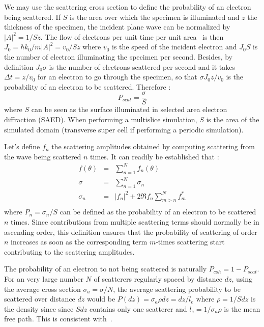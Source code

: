We may use the scattering cross section to define the probability of an electron
being scattered. If $S$ is the area over which the specimen is illuminated and
$z$ the thickness of the specimen, the incident plane wave can be normalized by
$|A|^2=1/Sz$. The flow of electrons per unit time per unit area~\cite{Vainshtein1964}
is then $J_0=\hbar k_0/m |A|^2=v_0/Sz$ where $v_0$ is the speed of the incident
electron and $J_0 S$ is the number of electron illuminating the specimen per second.
Besides, by definition $J_0\sigma$ is the number of electrons scattered per second
and it takes $\Delta t=z/v_0$ for an electron to go through the specimen,
so that $\sigma J_0z/v_0$ is the probability of an electron to be scattered.
Therefore :
%
\begin{equation*}
  P_{scat}=\frac{\sigma}{S}
\end{equation*}
%
where $S$ can be seen as the surface illuminated in selected area electron
diffraction (SAED). When performing a multislice simulation, $S$ is the area of
the simulated domain (transverse super cell if performing a periodic simulation).

Let's define $f_n$ the scattering amplitudes obtained by computing scattering
from the wave being scattered $n$ times. It can readily be established that :
%
\begin{eqnarray}
    f(\theta) &=& \sum_{n=1}^N f_n(\theta)  \nonumber\\
    \sigma    &=& \sum_{n=1}^N \sigma_n     \nonumber\\
    \sigma_n  &=& \lvert f_n\rvert^{2} + 2\Re f_n\sum_{m>n}^Nf_m^{*}\label{eq:sigma_n}\\\nonumber
\end{eqnarray}
%
where $P_n=\sigma_n/S$ can be defined as the probability of an electron to be
scattered $n$ times. Since contributions from multiple scattering terms should
normally be in ascending order, this definition ensures that the probability of
scattering of order $n$ increases as soon as the corresponding term $m$-times
scattering start contributing to the scattering amplitudes.

The probability of an electron to not being scattered is naturally $P_{coh}=1-P_{scat}$.
For an very large number $N$ of scatterers regularly spaced by distance
$dz$, using the average cross section $\sigma_a=\sigma/N$, the average scattering
probability to be scattered over distance $dz$ would be
$P(dz)=\sigma_a\rho dz=dz/l_e$ where $\rho=1/Sdz$ is the density since since $Sdz$
contains only one scatterer and $l_e=1/\sigma_a\rho$ is the mean free path.
This is consistent with~\cite{Latychevskaia2019}.



